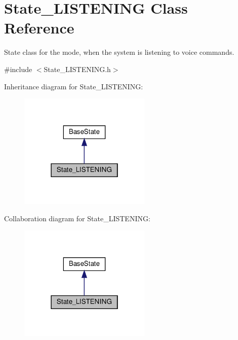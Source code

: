 \hypertarget{class_state___l_i_s_t_e_n_i_n_g}{}\section{State\+\_\+\+L\+I\+S\+T\+E\+N\+I\+NG Class Reference}
\label{class_state___l_i_s_t_e_n_i_n_g}


State class for the mode, when the system is listening to voice commands.  




{\ttfamily \#include $<$State\+\_\+\+L\+I\+S\+T\+E\+N\+I\+N\+G.\+h$>$}



Inheritance diagram for State\+\_\+\+L\+I\+S\+T\+E\+N\+I\+NG\+:\nopagebreak
\begin{figure}[H]
\begin{center}
\leavevmode
\includegraphics[width=178pt]{class_state___l_i_s_t_e_n_i_n_g__inherit__graph}
\end{center}
\end{figure}


Collaboration diagram for State\+\_\+\+L\+I\+S\+T\+E\+N\+I\+NG\+:\nopagebreak
\begin{figure}[H]
\begin{center}
\leavevmode
\includegraphics[width=178pt]{class_state___l_i_s_t_e_n_i_n_g__coll__graph}
\end{center}
\end{figure}
